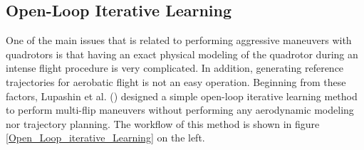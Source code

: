 \documentclass{thesisreport}
\begin{document}
\subsection{Open-Loop Iterative Learning}

One of the main issues that is related to performing aggressive maneuvers with quadrotors is that having an exact physical modeling of the quadrotor during an intense flight procedure is very complicated. In addition, generating reference trajectories for aerobatic flight is not an easy operation. Beginning from these factors, Lupashin et al. (\cite{Lupashin2010,Lupashin2011,Lupashin2012})
designed a simple open-loop iterative learning method to perform multi-flip maneuvers without performing any aerodynamic modeling nor trajectory planning. The workflow of this method is shown in figure \ref{Open_Loop_iterative_Learning} on the left.

\newpage
\end{document}
